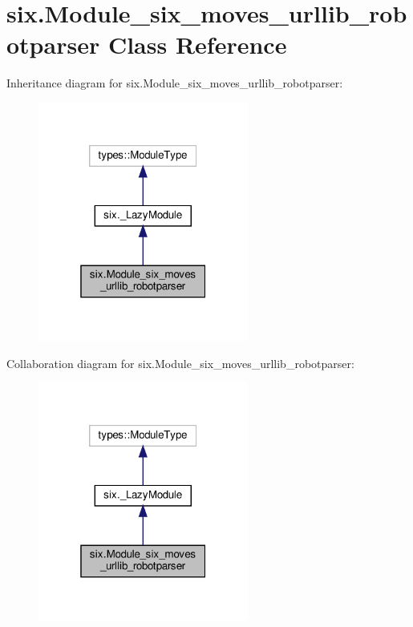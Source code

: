 \hypertarget{classsix_1_1Module__six__moves__urllib__robotparser}{}\section{six.\+Module\+\_\+six\+\_\+moves\+\_\+urllib\+\_\+robotparser Class Reference}
\label{classsix_1_1Module__six__moves__urllib__robotparser}


Inheritance diagram for six.\+Module\+\_\+six\+\_\+moves\+\_\+urllib\+\_\+robotparser\+:
\nopagebreak
\begin{figure}[H]
\begin{center}
\leavevmode
\includegraphics[width=196pt]{classsix_1_1Module__six__moves__urllib__robotparser__inherit__graph}
\end{center}
\end{figure}


Collaboration diagram for six.\+Module\+\_\+six\+\_\+moves\+\_\+urllib\+\_\+robotparser\+:
\nopagebreak
\begin{figure}[H]
\begin{center}
\leavevmode
\includegraphics[width=196pt]{classsix_1_1Module__six__moves__urllib__robotparser__coll__graph}
\end{center}
\end{figure}
